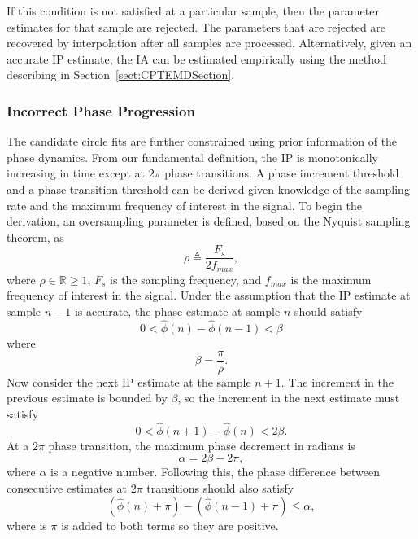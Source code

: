 \documentclass[11pt,draftcls,onecolumn]{IEEEtran}
\begin{document}
If this condition is not satisfied at a particular sample, then the parameter estimates for that sample are rejected. The parameters that are rejected are recovered by interpolation after all samples are processed. Alternatively, given an accurate IP estimate, the IA can be estimated empirically using the method describing in Section~\ref{sect:CPTEMDSection}.   

\subsubsection{Incorrect Phase Progression}
The candidate circle fits are further constrained using prior information of the phase dynamics. From our fundamental definition, the IP is monotonically increasing in time except at $2\pi$ phase transitions. A phase increment threshold and a phase transition threshold can be derived given knowledge of the sampling rate and the maximum frequency of interest in the signal. To begin the derivation, an oversampling parameter is defined, based on the Nyquist sampling theorem, as
\begin{equation}
	\rho\triangleq\frac{F_s}{2f_{max}},
\end{equation}
where $\rho \in \mathbb{R} \ge 1$, $F_s$ is the sampling frequency, and $f_{max}$ is the maximum frequency of interest in the signal. Under the assumption that the IP estimate at sample $n-1$ is accurate, the phase estimate at sample $n$ should satisfy
\begin{equation}
	0 < \hat\phi(n)-\hat\phi(n-1) < \beta
\end{equation}
where 
\begin{equation}
	\beta = \frac{\pi}{\rho}.
\end{equation}
Now consider the next IP estimate at the sample $n+1$. The increment in the previous estimate is bounded by $\beta$, so the increment in the next estimate must satisfy
\begin{equation}\label{eq:Prior1}
	0 < \hat\phi(n+1)-\hat\phi(n) < 2\beta.
\end{equation} 
At a $2\pi$ phase transition, the maximum phase decrement in radians is
\begin{equation}
	\alpha=2\beta-2\pi,
\end{equation}
where $\alpha$ is a negative number. Following this, the phase difference between consecutive estimates at $2\pi$ transitions should also satisfy
\begin{equation}\label{eq:Prior2}
(\hat{\phi} \left( n \right)+\pi) - (\hat{\phi} \left( n-1\right)+\pi) \le \alpha, 
\end{equation}
where is $\pi$ is added to both terms so they are positive.
\end{document}
